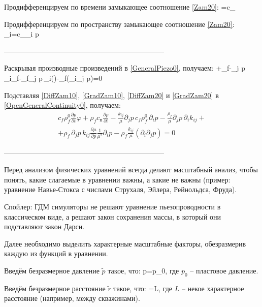 \documentclass[main.tex]{subfiles}
\begin{document}
Продифференцируем по времени замыкающее соотношение \eqref{Zam20}:
\beq\label{DiffZam20}
=c_
\eeq

Продифференцируем по пространству замыкающее соотношение \eqref{Zam20}:
\beq\label{GradZam20}
\partial_i\varphi=c_\partial_i p
\eeq

--------------------------------------------------------------------

Раскрывая производные произведений в \eqref{GeneralPiezo0}, получаем:
\beq\label{OpenGeneralContinuity0}
\varphi+\rho_f-\partial_j p\,\partial_i\rho_f-\rho_f\partial_j p\,\partial_i\!\left(\right)-\rho_f\left(\partial_i\partial_j p\right)=0
\eeq

Подставляя \eqref{DiffZam10}, \eqref{GradZam10}, \eqref{DiffZam20} и \eqref{GradZam20} в \eqref{OpenGeneralContinuity0}, получаем:
\begin{multline}\label{Expanded0}
c_f\rho_f^0\frac{\partial p}{\partial t}\varphi+\rho_f c_\text{п}\frac{\partial p}{\partial t}-\frac{k_{ij}}{\mu}\partial_j p\,c_f\rho_f^0\,\partial_i p-\frac{\rho_f}{\mu}\partial_j p\,\partial_i k_{ij}+\\+\rho_f\,\partial_j p\,k_{ij}\frac{\partial\mu}{\partial p}\frac{1}{\mu^2}\partial_i p-\rho_f\frac{k_{ij}}{\mu}\left(\partial_i\partial_j p\right)=0
\end{multline}

--------------------------------------------------------------------

Перед анализом физических уравнений всегда делают масштабный анализ, чтобы понять, какие слагаемые в уравнении важны, а какие не важны (пример: уравнение Навье-Стокса с числами Струхаля, Эйлера, Рейнольдса, Фруда).

Спойлер: ГДМ симуляторы не решают уравнение пьезопроводности в классическом виде, а решают закон сохранения массы, в который они подставляют закон Дарси.

Далее необходимо выделить характерные масштабные факторы, обезразмерив каждую из функций в уравнении.

Введём безразмерное давление $\tilde{p}$ такое, что:
\beq
p=\cdot p_0,
\eeq
где $p_0$ -- пластовое давление.

Введём безразмерное расстояние $\tilde{r}$ такое, что:
\beq
{}=\cdot L,
\eeq
где $L$ -- некое характерное расстояние (например, между скважинами).
\end{document}
